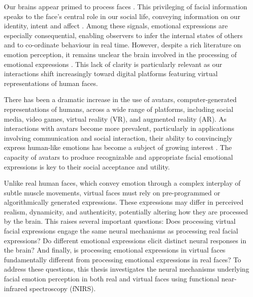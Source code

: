 Our brains appear primed to process faces \citep{johnson_newborns_1991, palmer_face_2020, powell_social_2018}. 
This privileging of facial information speaks to the face's central role in our social life, conveying information on our identity, intent and affect \citep{sheehan_morphological_2014, cowen_sixteen_2021, willis_first_2006}. 
Among these signals, emotional expressions are especially consequential, enabling observers to infer the internal states of others and to co-ordinate behaviour in real time.
However, despite a rich literature on emotion perception, it remains unclear the brain involved in the processing of emotional expressions \citep{barrett_are_2006}. 
This lack of clarity is particularly relevant as our interactions shift increasingly toward digital platforms featuring virtual representations of human faces. 

There has been a dramatic increase in the use of avatars, computer-generated representations of humans, across a wide range of platforms, including social media, video games, virtual reality (VR), and augmented reality (AR). 
As interactions with avatars become more prevalent, particularly in applications involving communication and social interaction, their ability to convincingly express human-like emotions has become a subject of growing interest \citep{kegel_dynamic_2020}. 
The capacity of avatars to produce recognizable and appropriate facial emotional expressions is key to their social acceptance and utility.

Unlike real human faces, which convey emotion through a complex interplay of subtle muscle movements, virtual faces must rely on pre-programmed or algorithmically generated expressions. 
These expressions may differ in perceived realism, dynamicity, and authenticity, potentially altering how they are processed by the brain. 
This raises several important questions: Does processing virtual facial expressions engage the same neural mechanisms as processing real facial expressions? 
Do different emotional expressions elicit distinct neural responses in the brain? 
And finally, is processing emotional expressions in virtual faces fundamentally different from processing emotional expressions in real faces?
To address these questions, this thesis investigates the neural mechanisms underlying facial emotion perception in both real and virtual faces using functional near-infrared spectroscopy (fNIRS).


